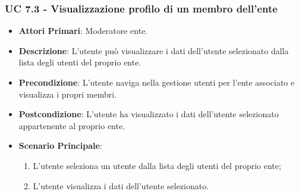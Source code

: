 			\subsubsection{UC 7.3 - Visualizzazione profilo di un membro dell'ente}
			\begin{itemize}
				\item \textbf{Attori Primari}: Moderatore ente.
				\item \textbf{Descrizione}: L'utente può visualizzare i dati dell'utente selezionato dalla lista degli utenti del proprio ente.
				\item \textbf{Precondizione}: L'utente naviga nella gestione utenti per l'ente associato e visualizza i propri membri.
				\item \textbf{Postcondizione}: L'utente ha visualizzato i dati dell'utente selezionato appartenente al proprio ente.
				\item \textbf{Scenario Principale}:
				\begin{enumerate}
					\item{L'utente seleziona un utente dalla lista degli utenti del proprio ente;}
					\item{L'utente visualizza i dati dell'utente selezionato.}
				\end{enumerate}
			\end{itemize}


